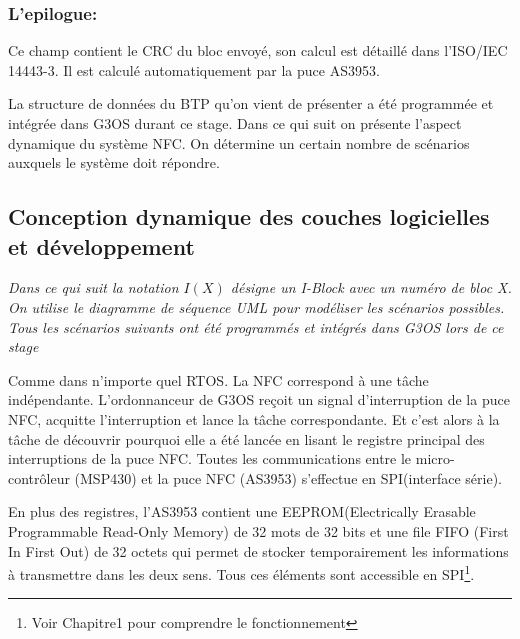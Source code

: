 \documentclass{themeensg}
\begin{document}
\subsubsection{L'epilogue:}
Ce champ contient le CRC du bloc envoyé, son calcul est détaillé dans l'ISO/IEC 14443-3. Il est calculé automatiquement par la puce AS3953.

La structure de données du BTP qu'on vient de présenter a été programmée et intégrée dans G3OS durant ce stage. Dans ce qui suit on présente l'aspect dynamique du système NFC. On détermine un certain nombre de scénarios auxquels le système doit répondre. 

\subsection{Conception dynamique des couches logicielles et développement}
\textit{ Dans ce qui suit la notation $I(X)$ désigne un I-Block avec un numéro de bloc X. On utilise le diagramme de séquence UML pour modéliser les scénarios possibles. Tous les scénarios suivants ont été programmés et intégrés dans G3OS lors de ce stage}

Comme dans n'importe quel RTOS. La NFC correspond à une tâche indépendante. L'ordonnanceur de G3OS reçoit un signal d'interruption de la puce NFC, acquitte l'interruption et lance la tâche correspondante. Et c'est alors à la tâche de découvrir pourquoi elle a été lancée en lisant le registre principal des interruptions de la puce NFC. Toutes les communications entre le micro-contrôleur (MSP430) et la puce NFC (AS3953) s'effectue en SPI(interface série).

En plus des registres, l'AS3953 contient une EEPROM(Electrically Erasable Programmable Read-Only Memory) de 32 mots de 32 bits et une file FIFO (First In First Out) de 32 octets qui permet de stocker temporairement les informations à transmettre dans les deux sens. Tous ces éléments sont accessible en SPI\footnote{Voir Chapitre1 pour comprendre le fonctionnement}.
\end{document}
